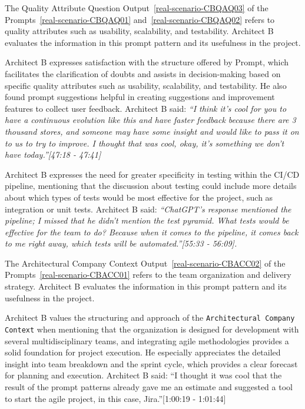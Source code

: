 
The Quality Attribute Question Output~\ref{real-scenario-CBQAQ03} of the Prompts~\ref{real-scenario-CBQAQ01} and~\ref{real-scenario-CBQAQ02} refers to quality attributes such as usability, scalability, and testability. Architect B evaluates the information in this prompt pattern and its usefulness in the project.

Architect B expresses satisfaction with the structure offered by Prompt, which facilitates the clarification of doubts and assists in decision-making based on specific quality attributes such as usability, scalability, and testability. He also found prompt suggestions helpful in creating suggestions and improvement features to collect user feedback. Architect B said: \textit{``I think it's cool for you to have a continuous evolution like this and have faster feedback because there are 3 thousand stores, and someone may have some insight and would like to pass it on to us to try to improve. I thought that was cool, okay, it's something we don't have today.''[47:18 - 47:41]}

Architect B expresses the need for greater specificity in testing within the CI/CD pipeline, mentioning that the discussion about testing could include more details about which types of tests would be most effective for the project, such as integration or unit tests. Architect B said: \textit{``ChatGPT's response mentioned the pipeline; I missed that he didn't mention the test pyramid. What tests would be effective for the team to do? Because when it comes to the pipeline, it comes back to me right away, which tests will be automated.''[55:33 - 56:09].
}


The Architectural Company Context Output~\ref{real-scenario-CBACC02} of the Prompts~\ref{real-scenario-CBACC01} refers to the team organization and delivery strategy. Architect B evaluates the information in this prompt pattern and its usefulness in the project.

Architect B values the structuring and approach of the \texttt{Architectural Company Context} when mentioning that the organization is designed for development with several multidisciplinary teams, and integrating agile methodologies provides a solid foundation for project execution. He especially appreciates the detailed insight into team breakdown and the sprint cycle, which provides a clear forecast for planning and execution. Architect B said: ``I thought it was cool that the result of the prompt patterns already gave me an estimate and suggested a tool to start the agile project, in this case, Jira.''[1:00:19 - 1:01:44]


